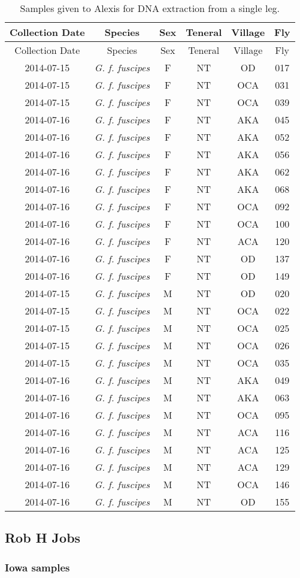 \documentclass[letterpaper]{scrartcl}
\begin{document}
\begin{longtable}[c]{@{}cccccc@{}}
\caption{Samples given to Alexis for DNA extraction from a single leg.
\label{2015-01-29T1}}\tabularnewline
\toprule
Collection Date & Species & Sex & Teneral & Village & Fly\tabularnewline
\midrule
\endfirsthead
\toprule
Collection Date & Species & Sex & Teneral & Village & Fly\tabularnewline
\midrule
\endhead
2014-07-15 & \emph{G. f. fuscipes} & F & NT & OD & 017\tabularnewline
2014-07-15 & \emph{G. f. fuscipes} & F & NT & OCA & 031\tabularnewline
2014-07-15 & \emph{G. f. fuscipes} & F & NT & OCA & 039\tabularnewline
2014-07-16 & \emph{G. f. fuscipes} & F & NT & AKA & 045\tabularnewline
2014-07-16 & \emph{G. f. fuscipes} & F & NT & AKA & 052\tabularnewline
2014-07-16 & \emph{G. f. fuscipes} & F & NT & AKA & 056\tabularnewline
2014-07-16 & \emph{G. f. fuscipes} & F & NT & AKA & 062\tabularnewline
2014-07-16 & \emph{G. f. fuscipes} & F & NT & AKA & 068\tabularnewline
2014-07-16 & \emph{G. f. fuscipes} & F & NT & OCA & 092\tabularnewline
2014-07-16 & \emph{G. f. fuscipes} & F & NT & OCA & 100\tabularnewline
2014-07-16 & \emph{G. f. fuscipes} & F & NT & ACA & 120\tabularnewline
2014-07-16 & \emph{G. f. fuscipes} & F & NT & OD & 137\tabularnewline
2014-07-16 & \emph{G. f. fuscipes} & F & NT & OD & 149\tabularnewline
2014-07-15 & \emph{G. f. fuscipes} & M & NT & OD & 020\tabularnewline
2014-07-15 & \emph{G. f. fuscipes} & M & NT & OCA & 022\tabularnewline
2014-07-15 & \emph{G. f. fuscipes} & M & NT & OCA & 025\tabularnewline
2014-07-15 & \emph{G. f. fuscipes} & M & NT & OCA & 026\tabularnewline
2014-07-15 & \emph{G. f. fuscipes} & M & NT & OCA & 035\tabularnewline
2014-07-16 & \emph{G. f. fuscipes} & M & NT & AKA & 049\tabularnewline
2014-07-16 & \emph{G. f. fuscipes} & M & NT & AKA & 063\tabularnewline
2014-07-16 & \emph{G. f. fuscipes} & M & NT & OCA & 095\tabularnewline
2014-07-16 & \emph{G. f. fuscipes} & M & NT & ACA & 116\tabularnewline
2014-07-16 & \emph{G. f. fuscipes} & M & NT & ACA & 125\tabularnewline
2014-07-16 & \emph{G. f. fuscipes} & M & NT & ACA & 129\tabularnewline
2014-07-16 & \emph{G. f. fuscipes} & M & NT & OCA & 146\tabularnewline
2014-07-16 & \emph{G. f. fuscipes} & M & NT & OD & 155\tabularnewline
\bottomrule
\end{longtable}

\subsection{Rob H Jobs}\label{rob-h-jobs}

\subsubsection{Iowa samples}\label{iowa-samples}
\end{document}
